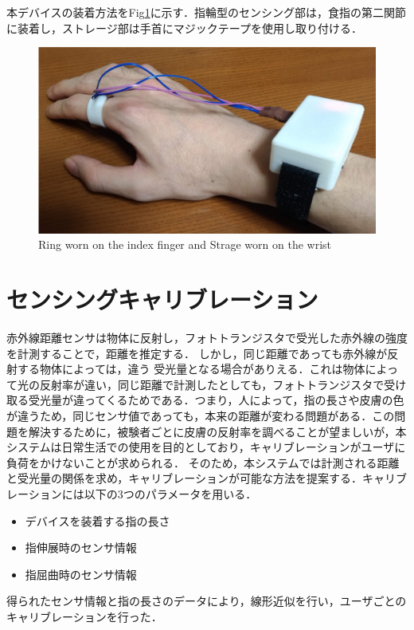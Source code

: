 本デバイスの装着方法をFig\ref{fig:ring}に示す．指輪型のセンシング部は，食指の第二関節に装着し，ストレージ部は手首にマジックテープを使用し取り付ける．



\begin{figure}[H]
  \centering
  \includegraphics[width=0.8\linewidth]{fig/fal4.png}
  \caption{Ring worn on the index finger and Strage worn on the wrist}
  \label{fig:ring}
\end{figure}


\section{センシングキャリブレーション}
赤外線距離センサは物体に反射し，フォトトランジスタで受光した赤外線の強度を計測することで，距離を推定する．
しかし，同じ距離であっても赤外線が反射する物体によっては，違う
受光量となる場合がありえる．これは物体によって光の反射率が違い，同じ距離で計測したとしても，フォトトランジスタで受け取る受光量が違ってくるためである．つまり，人によって，指の長さや皮膚の色が違うため，同じセンサ値であっても，本来の距離が変わる問題がある．この問題を解決するために，被験者ごとに皮膚の反射率を調べることが望ましいが，本システムは日常生活での使用を目的としており，キャリブレーションがユーザに負荷をかけないことが求められる．
そのため，本システムでは計測される距離と受光量の関係を求め，キャリブレーションが可能な方法を提案する．キャリブレーションには以下の3つのパラメータを用いる．

\begin{itemize}
 \item デバイスを装着する指の長さ
 \item 指伸展時のセンサ情報
 \item 指屈曲時のセンサ情報
\end{itemize}

得られたセンサ情報と指の長さのデータにより，線形近似を行い，ユーザごとのキャリブレーションを行った．




